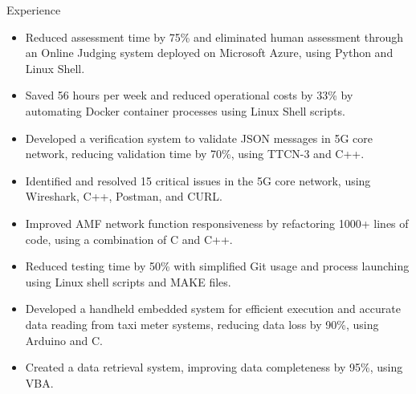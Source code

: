 \documentclass{resume} %
\begin{document}
\begin{workSection}{Experience}
    \experienceItem[
    company=CodePro Education \& Universities,
    location=Taichung{,} Taiwan,
    position=Software Engineer,
    duration=Dec 2019 – Dec 2020
    ]
    \vspace{-0.65em}
    \begin{itemize}
        \itemsep -6pt {}
        \item Reduced assessment time by 75\% and eliminated human assessment
              through an Online Judging system deployed on Microsoft Azure,
              using Python and
              Linux Shell.
        \item Saved 56 hours per week and reduced operational costs by 33\% by
              automating Docker container processes using Linux Shell scripts.
    \end{itemize}

    \experienceItem[
    company=Free5gc department of NCTU,
    location=Hsinchu{,} Taiwan,
    position=Backend Engineer,
    duration=Jul 2019 – Nov 2019
    ]
    \vspace{-0.65em}
    \begin{itemize}
        \itemsep -6pt {}
        \item Developed a verification system to validate JSON messages
              in 5G core network, reducing validation time by
              70\%, using TTCN-3 and C++.
        \item Identified and resolved 15 critical issues in the 5G core
              network, using Wireshark, C++, Postman, and CURL.
        \item Improved AMF network function responsiveness by refactoring 1000+
              lines of code, using a combination of C and C++.
        \item Reduced testing time by 50\% with simplified Git usage and
              process launching using Linux shell scripts and MAKE files.
    \end{itemize}

    \experienceItem[
    company=Ministry of Transportation and Communications TW \& NCTU,
    location=Taipei{,} Taiwan,
    position=Embedded System engineer,
    duration=Jun 2016 – Sep 2016
    ]
    \vspace{-0.65em}
    \begin{itemize}
        \itemsep -6pt {}
        \item Developed a handheld embedded system for efficient execution and
              accurate data reading from taxi meter systems, reducing data loss
              by
              90\%, using Arduino and C.
        \item Created a data retrieval system, improving data completeness by
              95\%,
              using VBA.
    \end{itemize}

\end{workSection}

\education{
\educationItem[
university=National Chiao Tung University (NCTU),
location=Hsinchu{,} Taiwan,
program=B.S.{,} Computer Science
]
}
\end{document}
